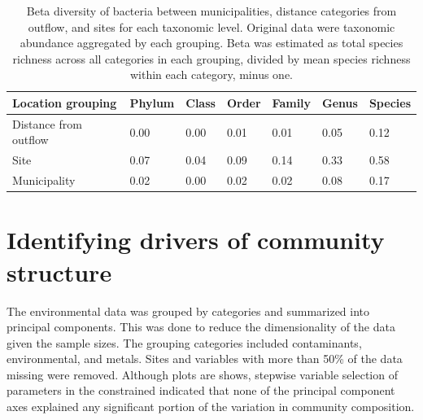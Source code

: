 \documentclass[letterpaper,12pt]{article}\usepackage[]{graphicx}\usepackage[]{color}
\begin{document}
\begin{table}[!tbp]
\caption{Beta diversity of bacteria between municipalities, distance categories from outflow, and sites for each taxonomic level.  Original data were taxonomic abundance aggregated by each grouping.  Beta was estimated as total species richness across all categories in each grouping, divided by mean species richness within each category, minus one.\label{tab:beta_bac}} 
\begin{center}
\begin{tabular}{lllllll}
\hline\hline
\multicolumn{1}{l}{Location grouping}&\multicolumn{1}{c}{Phylum}&\multicolumn{1}{c}{Class}&\multicolumn{1}{c}{Order}&\multicolumn{1}{c}{Family}&\multicolumn{1}{c}{Genus}&\multicolumn{1}{c}{Species}\tabularnewline
\hline
Distance from outflow&0.00&0.00&0.01&0.01&0.05&0.12\tabularnewline
Site&0.07&0.04&0.09&0.14&0.33&0.58\tabularnewline
Municipality&0.02&0.00&0.02&0.02&0.08&0.17\tabularnewline
\hline
\end{tabular}\end{center}

\end{table}


\section{Identifying drivers of community structure}

The environmental data was grouped by categories and summarized into principal components.  This was done to reduce the dimensionality of the data given the sample sizes.  The grouping categories included contaminants, environmental, and metals.  Sites and variables with more than 50\% of the data missing were removed.  Although plots are shows, stepwise variable selection of parameters in the constrained indicated that none of the principal component axes explained any significant portion of the variation in community composition. 
\end{document}
